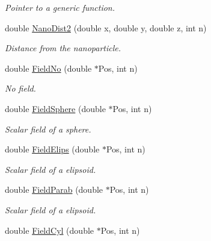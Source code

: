 \begin{DoxyCompactItemize}
\begin{DoxyCompactList}\small\item\em Pointer to a generic function. \end{DoxyCompactList}\item 
double \hyperlink{classVarData_aa61f01d24c76e8a70a3efe30ea22176b}{Nano\+Dist2} (double x, double y, double z, int n)\hypertarget{classVarData_aa61f01d24c76e8a70a3efe30ea22176b}{}\label{classVarData_aa61f01d24c76e8a70a3efe30ea22176b}

\begin{DoxyCompactList}\small\item\em Distance from the nanoparticle. \end{DoxyCompactList}\item 
double \hyperlink{classVarData_a735d13f805f242e68213f0fc5e93c1b6}{Field\+No} (double $\ast$Pos, int n)\hypertarget{classVarData_a735d13f805f242e68213f0fc5e93c1b6}{}\label{classVarData_a735d13f805f242e68213f0fc5e93c1b6}

\begin{DoxyCompactList}\small\item\em No field. \end{DoxyCompactList}\item 
double \hyperlink{classVarData_a45e630d9fa10932596d44d946e2800f4}{Field\+Sphere} (double $\ast$Pos, int n)\hypertarget{classVarData_a45e630d9fa10932596d44d946e2800f4}{}\label{classVarData_a45e630d9fa10932596d44d946e2800f4}

\begin{DoxyCompactList}\small\item\em Scalar field of a sphere. \end{DoxyCompactList}\item 
double \hyperlink{classVarData_a6ba3ff45370fe3f774ed6a8f5b022aaa}{Field\+Elips} (double $\ast$Pos, int n)\hypertarget{classVarData_a6ba3ff45370fe3f774ed6a8f5b022aaa}{}\label{classVarData_a6ba3ff45370fe3f774ed6a8f5b022aaa}

\begin{DoxyCompactList}\small\item\em Scalar field of a elipsoid. \end{DoxyCompactList}\item 
double \hyperlink{classVarData_a59948db4efbb953a20515f50b3daacc6}{Field\+Parab} (double $\ast$Pos, int n)\hypertarget{classVarData_a59948db4efbb953a20515f50b3daacc6}{}\label{classVarData_a59948db4efbb953a20515f50b3daacc6}

\begin{DoxyCompactList}\small\item\em Scalar field of a elipsoid. \end{DoxyCompactList}\item 
double \hyperlink{classVarData_acd3ad67b85fda45f9aee58a45d7391f9}{Field\+Cyl} (double $\ast$Pos, int n)\hypertarget{classVarData_acd3ad67b85fda45f9aee58a45d7391f9}{}\label{classVarData_acd3ad67b85fda45f9aee58a45d7391f9}


\end{DoxyCompactItemize}
